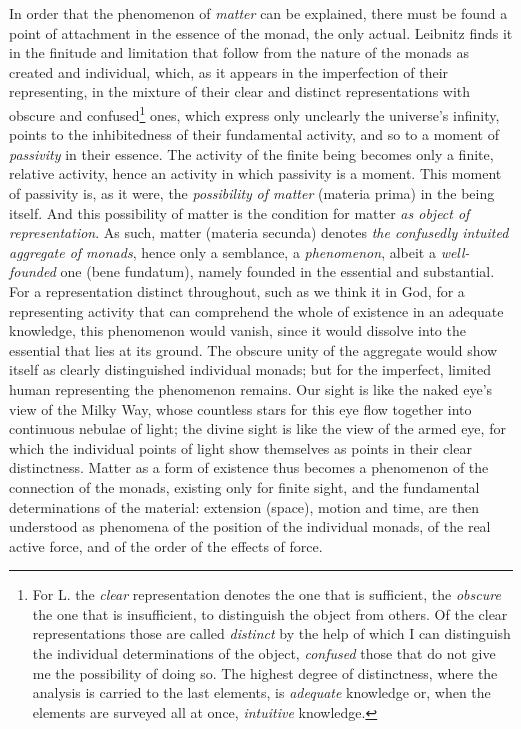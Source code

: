 In order that the phenomenon of \emph{matter} can be explained, there
must be found a point of attachment in the essence of the monad, the
only actual. Leibnitz finds it in the finitude and limitation that
follow from the nature of the monads as created and individual, which,
as it appears in the imperfection of their representing, in the mixture
of their clear and distinct representations with obscure and
confused\footnote{For L. the \emph{clear} representation denotes the
one that is sufficient, the \emph{obscure} the one that is insufficient,
to distinguish the object from others. Of the clear representations
those are called \emph{distinct} by the help of which I can distinguish
the individual determinations of the object, \emph{confused} those that
do not give me the possibility of doing so. The highest degree of
distinctness, where the analysis is carried to the last elements, is
\emph{adequate} knowledge or, when the elements are surveyed all at
once, \emph{intuitive} knowledge.} ones, which express only unclearly
the universe's infinity, points to the inhibitedness of their
fundamental activity, and so to a moment of \emph{passivity} in their
essence. The activity of the finite being becomes only a finite,
relative activity, hence an activity in which passivity is a moment.
This moment of passivity is, as it were, the \emph{possibility}
\emph{of matter} (materia prima) in the being itself. And this
possibility of matter is the condition for matter \emph{as object of
representation}. As such, matter (materia secunda) denotes \emph{the
confusedly intuited aggregate of monads}, hence only a semblance, a
\emph{phenomenon}, albeit a \emph{well-founded} one (bene fundatum),
namely founded in the essential and substantial. For a representation
distinct throughout, such as we think it in God, for a representing
activity that can comprehend the whole of existence in an adequate
knowledge, this phenomenon would vanish, since it would dissolve into
the essential that lies at its ground. The obscure unity of the
aggregate would show itself as clearly distinguished individual monads;
but for the imperfect, limited human representing the phenomenon
remains. Our sight is like the naked eye's view of the Milky Way, whose
countless stars for this eye flow together into continuous nebulae of
light; the divine sight is like the view of the armed eye, for which
the individual points of light show themselves as points in their clear
distinctness. Matter as a form of existence thus becomes a phenomenon of
the connection of the monads, existing only for finite sight, and the
fundamental determinations of the material: extension (space), motion
and time, are then understood as phenomena of the position of the
individual monads, of the real active force, and of the order of the
effects of force.

